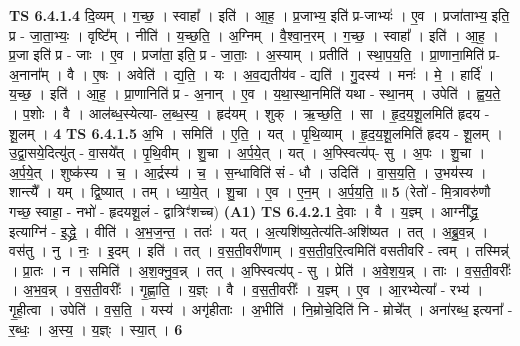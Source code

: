 \documentclass[17pt]{extarticle}
\begin{document}
                  \newline
                                \textbf{ TS 6.4.1.4} \newline
                  दि॒व्यम् । ग॒च्छ॒ । स्वाहा᳚ । इति॑ । आ॒ह॒ । प्र॒जाभ्य॒ इति॑ प्र-जाभ्यः॑ । ए॒व । प्रजा॑ताभ्य॒ इति॒ प्र - जा॒ता॒भ्यः॒ । वृष्टि᳚म् । नीति॑ । य॒च्छ॒ति॒ । अ॒ग्निम् । वै॒श्वा॒न॒रम् । ग॒च्छ॒ । स्वाहा᳚ । इति॑ । आ॒ह॒ । प्र॒जा इति॑ प्र - जाः । ए॒व । प्रजा॑ता॒ इति॒ प्र - जा॒ताः॒ । अ॒स्याम् । प्रतीति॑ । स्था॒प॒य॒ति॒ । प्रा॒णाना॒मिति॑ प्र-अ॒नाना᳚म् । वै । ए॒षः । अवेति॑ । द्य॒ति॒ । यः । अ॒व॒द्यतीय॑व - द्यति॑ । गु॒दस्य॑ । मनः॑ । मे॒ । हार्दि॑ । य॒च्छ॒ । इति॑ । आ॒ह॒ । प्रा॒णानिति॑ प्र - अ॒नान् । ए॒व । य॒था॒स्था॒नमिति॑ यथा - स्था॒नम् । उपेति॑ । ह्व॒य॒ते॒ । प॒शोः । वै । आल॑ब्ध॒स्येत्या- ल॒ब्ध॒स्य॒ । हृद॑यम् । शुक् । ऋ॒च्छ॒ति॒ । सा । हृ॒द॒य॒शू॒लमिति॑ हृदय - शू॒लम् । \textbf{  4} \newline
                  \newline
                                \textbf{ TS 6.4.1.5} \newline
                  अ॒भि । समिति॑ । ए॒ति॒ । यत् । पृ॒थि॒व्याम् । हृ॒द॒य॒शू॒लमिति॑ हृदय - शू॒लम् । उ॒द्वा॒सये॒दित्यु॑त् - वा॒सये᳚त् । पृ॒थि॒वीम् । शु॒चा । अ॒र्प॒ये॒त् । यत् । अ॒फ्स्वित्य॑प्- सु । अ॒पः । शु॒चा । अ॒र्प॒ये॒त् । शुष्क॑स्य । च॒ । आ॒र्द्रस्य॑ । च॒ । स॒न्धाविति॑ सं - धौ । उदिति॑ । वा॒स॒य॒ति॒ । उ॒भय॑स्य । शान्त्यै᳚ । यम् । द्वि॒ष्यात् । तम् । ध्या॒ये॒त् । शु॒चा । ए॒व । ए॒न॒म् । अ॒र्प॒य॒ति॒ ॥ \textbf{  5 } \newline
                  \newline
                      (रेतो॑ - मि॒त्रावरु॑णौ गच्छ॒ स्वाहा॒ - नभो॑ - हृदयशू॒लं - द्वात्रिꣳ॑शच्च)  \textbf{(A1)} \newline \newline
                                \textbf{ TS 6.4.2.1} \newline
                  दे॒वाः । वै । य॒ज्ञ्म् । आग्नी᳚द्ध्र॒ इत्याग्नि॑ - इ॒द्ध्रे॒ । वीति॑ । अ॒भ॒ज॒न्त॒ । ततः॑ । यत् । अ॒त्यशि॑ष्य॒तेत्य॑ति-अशि॑ष्यत । तत् । अ॒ब्रु॒व॒न्न् । वस॑तु । नु । नः॒ । इ॒दम् । इति॑ । तत् । व॒स॒ती॒वरी॑णाम् । व॒स॒ती॒व॒रि॒त्वमिति॑ वसतीवरि - त्वम् । तस्मिन्न्॑ । प्रा॒तः । न । समिति॑ । अ॒श॒क्नु॒व॒न्न् । तत् । अ॒फ्स्वित्य॑प् - सु । प्रेति॑ । अ॒वे॒श॒य॒न्न् । ताः । व॒स॒ती॒वरीः᳚ । अ॒भ॒व॒न्न् । व॒स॒ती॒वरीः᳚ । गृ॒ह्णा॒ति॒ । य॒ज्ञ्ः । वै । व॒स॒ती॒वरीः᳚ । य॒ज्ञ्म् । ए॒व । आ॒रभ्येत्या᳚ - रभ्य॑ । गृ॒ही॒त्वा । उपेति॑ । व॒स॒ति॒ । यस्य॑ । अगृ॑हीताः । अ॒भीति॑ । नि॒म्रोचे॒दिति॑ नि - म्रोचे᳚त् । अना॑रब्ध॒ इत्यना᳚ - र॒ब्धः॒ । अ॒स्य॒ । य॒ज्ञ्ः । स्या॒त् । \textbf{  6} \newline
\end{document}
